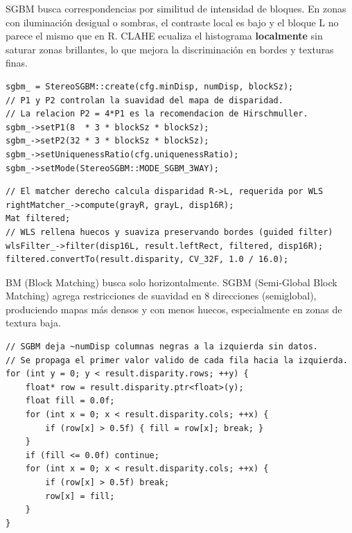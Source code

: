 \documentclass[11pt,a4paper]{article}
\begin{document}
\begin{critbox}[frametitle={Por qué CLAHE antes de SGBM}]
SGBM busca correspondencias por similitud de intensidad de bloques. En zonas con
iluminación desigual o sombras, el contraste local es bajo y el bloque L no parece
el mismo que en R. CLAHE ecualiza el histograma \textbf{localmente} sin saturar
zonas brillantes, lo que mejora la discriminación en bordes y texturas finas.
\end{critbox}

\begin{lstlisting}[caption={Paso 4: SGBM — parámetros clave (líneas 29–35)}]
sgbm_ = StereoSGBM::create(cfg.minDisp, numDisp, blockSz);
// P1 y P2 controlan la suavidad del mapa de disparidad.
// La relacion P2 = 4*P1 es la recomendacion de Hirschmuller.
sgbm_->setP1(8  * 3 * blockSz * blockSz);
sgbm_->setP2(32 * 3 * blockSz * blockSz);
sgbm_->setUniquenessRatio(cfg.uniquenessRatio);
sgbm_->setMode(StereoSGBM::MODE_SGBM_3WAY);
\end{lstlisting}

\begin{lstlisting}[caption={Paso 5: WLS — posprocesamiento (líneas 101–108)}]
// El matcher derecho calcula disparidad R->L, requerida por WLS
rightMatcher_->compute(grayR, grayL, disp16R);
Mat filtered;
// WLS rellena huecos y suaviza preservando bordes (guided filter)
wlsFilter_->filter(disp16L, result.leftRect, filtered, disp16R);
filtered.convertTo(result.disparity, CV_32F, 1.0 / 16.0);
\end{lstlisting}

\begin{critbox}[frametitle={SGBM vs BM — por qué usamos SGBM}]
BM (Block Matching) busca solo horizontalmente. SGBM (Semi-Global Block Matching)
agrega restricciones de suavidad en 8 direcciones (semiglobal), produciendo mapas
más densos y con menos huecos, especialmente en zonas de textura baja.
\end{critbox}

\begin{lstlisting}[caption={Paso 6: Relleno de zona inválida (propagación horizontal)}]
// SGBM deja ~numDisp columnas negras a la izquierda sin datos.
// Se propaga el primer valor valido de cada fila hacia la izquierda.
for (int y = 0; y < result.disparity.rows; ++y) {
    float* row = result.disparity.ptr<float>(y);
    float fill = 0.0f;
    for (int x = 0; x < result.disparity.cols; ++x) {
        if (row[x] > 0.5f) { fill = row[x]; break; }
    }
    if (fill <= 0.0f) continue;
    for (int x = 0; x < result.disparity.cols; ++x) {
        if (row[x] > 0.5f) break;
        row[x] = fill;
    }
}
\end{lstlisting}
\end{document}
